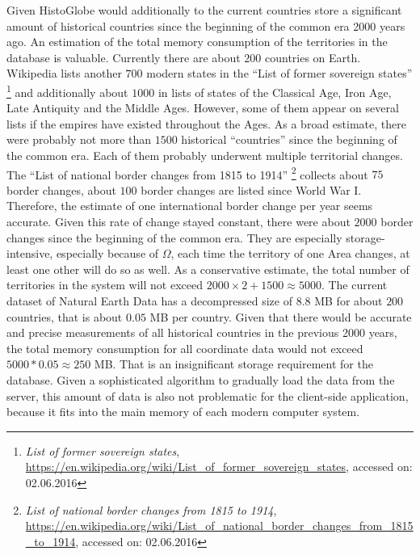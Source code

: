 Given HistoGlobe would additionally to the current countries store a significant amount of historical countries since the beginning of the common era 2000 years ago. An estimation of the total memory consumption of the territories in the database is valuable. Currently there are about $200$ countries on Earth. Wikipedia lists another $700$ modern states in the ``List of former sovereign states''
\footnote{
  \emph{List of former sovereign states},
  \url{https://en.wikipedia.org/wiki/List_of_former_sovereign_states},
  accessed on: 02.06.2016
}
and additionally about $1000$ in lists of states of the Classical Age, Iron Age, Late Antiquity and the Middle Ages. However, some of them appear on several lists if the empires have existed throughout the Ages. As a broad estimate, there were probably not more than $1500$ historical ``countries'' since the beginning of the common era. Each of them probably underwent multiple territorial changes. The ``List of national border changes from 1815 to 1914''
\footnote{
  \emph{List of national border changes from 1815 to 1914},
  \url{https://en.wikipedia.org/wiki/List_of_national_border_changes_from_1815_to_1914},
  accessed on: 02.06.2016
}
collects about $75$ border changes, about $100$ border changes are listed since World War I. Therefore, the estimate of one international border change per year seems accurate. Given this rate of change stayed constant, there were about $2000$ border changes since the beginning of the common era. They are especially storage-intensive, especially because of $\Omega$, each time the territory of one Area changes, at least one other will do so as well. As a conservative estimate, the total number of territories in the system will not exceed $2000 \times 2 + 1500 \approx 5000$. The current dataset of Natural Earth Data has a decompressed size of $8.8$ MB for about $200$ countries, that is about $0.05$ MB per country. Given that there would be accurate and precise measurements of all historical countries in the previous 2000 years, the total memory consumption for all coordinate data would not exceed $5000 * 0.05 \approx 250$ MB. That is an insignificant storage requirement for the database. Given a sophisticated algorithm to gradually load the data from the server, this amount of data is also not problematic for the client-side application, because it fits into the main memory of each modern computer system.



